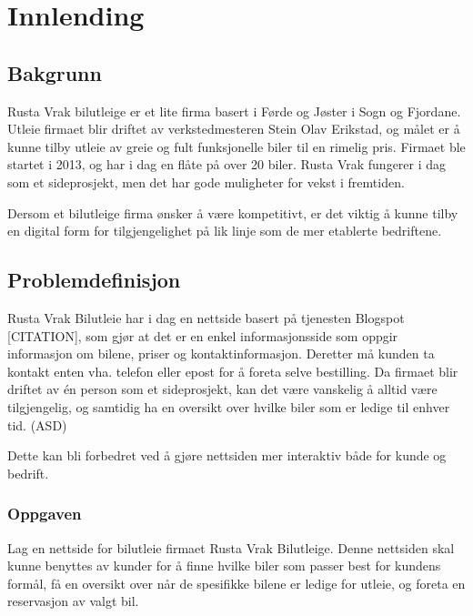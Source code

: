 \chapter{Innlending}


\section{Bakgrunn}
Rusta Vrak bilutleige er et lite firma basert i Førde og Jøster i Sogn og Fjordane. Utleie firmaet blir driftet av verkstedmesteren Stein Olav Erikstad, og målet er å kunne tilby utleie av greie og fult funksjonelle biler til en rimelig pris. Firmaet ble startet i 2013, og har i dag en flåte på over 20 biler. Rusta Vrak fungerer i dag som et sideprosjekt, men det har gode muligheter for vekst i fremtiden.\cite{bachelor}

Dersom et bilutleige firma ønsker å være kompetitivt, er det viktig å kunne tilby en digital form for tilgjengelighet på lik linje som de mer etablerte bedriftene.  


\section{Problemdefinisjon}
Rusta Vrak Bilutleie har i dag en nettside basert på tjenesten Blogspot [CITATION], som gjør at det er en enkel informasjonsside som oppgir informasjon om bilene, priser og kontaktinformasjon. Deretter må kunden ta kontakt enten vha. telefon eller epost for å foreta selve bestilling. Da firmaet blir driftet av én person som et sideprosjekt, kan det være vanskelig å alltid være tilgjengelig, og samtidig ha en oversikt over hvilke biler som er ledige til enhver tid. (ASD)

Dette kan bli forbedret ved å gjøre nettsiden mer interaktiv både for kunde og bedrift. 

\subsection{Oppgaven}
Lag en nettside for bilutleie firmaet Rusta Vrak Bilutleige. Denne nettsiden skal kunne benyttes av kunder for å finne hvilke biler som passer best for kundens formål, få en oversikt over når de spesifikke bilene er ledige for utleie, og foreta en reservasjon av valgt bil.

